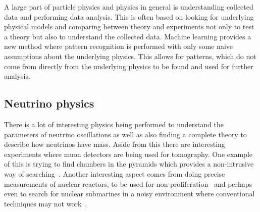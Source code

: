 A large part of particle physics and physics in general is understanding collected data and performing data analysis. This is often based on looking for underlying physical models and comparing between theory and experiments not only to test a theory but also to understand the collected data. Machine learning provides a new method where pattern recognition is performed with only some naive assumptions about the underlying physics. This allows for patterns, which do not come from directly from the underlying physics to be found and used for further analysis.

\subsection{Neutrino physics}

There is a lot of interesting physics being performed to understand the parameters of neutrino oscillations as well as also finding a complete theory to describe how neutrinos have mass. Aside from this there are interesting experiments where muon detectors are being used for tomography. One example of this is trying to find chambers in the pyramids which provides a non-intrusive way of searching~\cite{86Morishima}. Another interesting aspect comes from doing precise measurements of nuclear reactors, to be used for non-proliferation~\cite{87Askins} and perhaps even to search for nuclear submarines in a noisy environment where conventional techniques may not work~\cite{88Jocher}.



